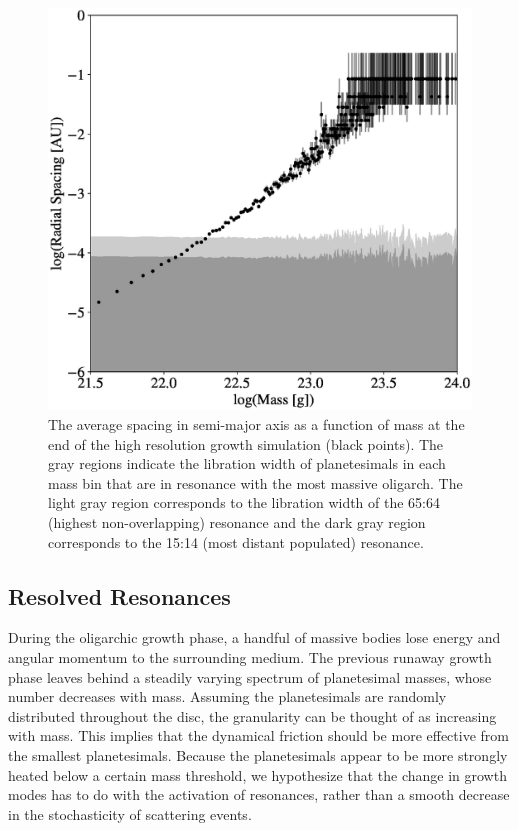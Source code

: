 \begin{figure}
    \includegraphics[width=\columnwidth]{figures/plSS/res_width.eps}
    \caption{The average spacing in semi-major axis as a function of mass at the end of the high resolution growth simulation 
    (black points). The gray regions indicate the libration width of planetesimals in each mass bin that are in resonance with the 
    most massive oligarch. The light gray region corresponds to the libration width of the 65:64 (highest non-overlapping) 
    resonance and the dark gray region corresponds to the 15:14 (most distant populated) resonance.}
    \label{fig:res_mass}
\end{figure}

\subsection{Resolved Resonances}\label{sec:resonances}

During the oligarchic growth phase, a handful of massive bodies lose energy and angular momentum to the surrounding 
medium. The previous runaway growth phase leaves behind a steadily varying spectrum of planetesimal masses, whose number 
decreases with mass. Assuming the planetesimals are randomly distributed throughout the disc, the granularity can be thought 
of as increasing with mass. This implies that the dynamical friction should be more effective from the smallest planetesimals. 
Because the planetesimals appear to be more strongly heated below a certain mass threshold, we hypothesize that the change 
in growth modes has to do with the activation of resonances, rather than a smooth decrease in the stochasticity of scattering 
events.

